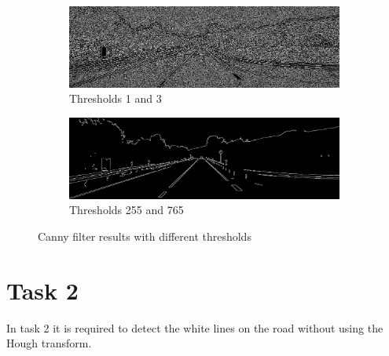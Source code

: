 \documentclass{article}
\begin{document}
\begin{figure}[H]
	\centering
	\begin{subfigure}{0.49\textwidth}
		\includegraphics[width=\textwidth]{street_scene_thresholdMin1Max3.png}
		\caption{Thresholds 1 and 3}
	\end{subfigure}
	\hfill
	\begin{subfigure}{0.49\textwidth}
		\includegraphics[width=\textwidth]{street_scene_thresholdMin255Max765.png}
		\caption{Thresholds 255 and 765}
	\end{subfigure}
	\caption{Canny filter results with different thresholds}
	\label{fig:canny_results}
\end{figure}


\section*{Task 2}
In task 2 it is required to detect the white lines on the road without using the Hough transform.


\end{document}
